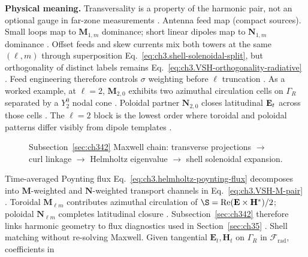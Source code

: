 \textbf{Physical meaning.} Transversality is a property of the harmonic pair, not an optional gauge in far-zone
measurements \cite{harrington2001}.
Antenna feed map (compact sources). Small loops map to \(\mathbf{M}_{1,m}\) dominance; short linear dipoles map to \(\mathbf{N}_{1,m}\) dominance
\cite{harrington2001}. Offset feeds and skew currents mix both towers at the same
\((\ell,m)\) through superposition Eq.~\eqref{eq:ch3.shell-solenoidal-split}, but orthogonality of distinct labels
remains Eq.~\eqref{eq:ch3.VSH-orthogonality-radiative} \cite{hansen1988}. Feed engineering therefore controls
\(\sigma\) weighting before \(\ell\) truncation \cite{harrington2001}.
As a worked example, at \(\ell=2\), \(\mathbf{M}_{2,0}\) exhibits two azimuthal circulation cells on \(\Gamma_R\) separated by a
\(Y_{2}^{0}\) nodal cone \cite{stratton1941}. Poloidal partner \(\mathbf{N}_{2,0}\) closes latitudinal
\(\mathbf{E}_t\) across those cells \cite{jackson1999}. The \(\ell=2\) block is the lowest order where toroidal and poloidal
patterns differ visibly from dipole templates \cite{harrington2001}.
\begin{figure}[t]
\centering
{}
\caption{Subsection~\ref{sec:ch342} Maxwell chain: transverse projections \(\to\) curl linkage \(\to\) Helmholtz
eigenvalue \(\to\) shell solenoidal expansion.}
\label{fig:ch3.342-maxwell-chain}
\end{figure}
Time-averaged Poynting flux Eq.~\eqref{eq:ch3.helmholtz-poynting-flux} decomposes into \(\mathbf{M}\)-weighted and
\(\mathbf{N}\)-weighted transport channels in Eq.~\eqref{eq:ch3.VSH-M-pair} \cite{poynting1884}. Toroidal
\(\mathbf{M}_{\ell m}\) contributes azimuthal circulation of \(\S=\Re(\E\times\H^{*})/2\); poloidal \(\mathbf{N}_{\ell m}\)
completes latitudinal closure \cite{hansen1988}. Subsection~\ref{sec:ch342} therefore links harmonic geometry to flux
diagnostics used in Section~\ref{sec:ch35} \cite{poynting1884}.
Shell matching without re-solving Maxwell. Given tangential \(\mathbf{E}_t,\mathbf{H}_t\) on \(\Gamma_R\) in \(\mathcal{F}_{\mathrm{rad}}\), coefficients in
